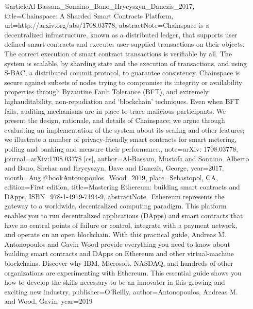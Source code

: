  @article{Al-Bassam_Sonnino_Bano_Hrycyszyn_Danezis_2017, title={Chainspace: A Sharded Smart Contracts Platform}, url={http://arxiv.org/abs/1708.03778}, abstractNote={Chainspace is a decentralized infrastructure, known as a distributed ledger, that supports user deﬁned smart contracts and executes user-supplied transactions on their objects. The correct execution of smart contract transactions is veriﬁable by all. The system is scalable, by sharding state and the execution of transactions, and using S-BAC, a distributed commit protocol, to guarantee consistency. Chainspace is secure against subsets of nodes trying to compromise its integrity or availability properties through Byzantine Fault Tolerance (BFT), and extremely highauditability, non-repudiation and ‘blockchain’ techniques. Even when BFT fails, auditing mechanisms are in place to trace malicious participants. We present the design, rationale, and details of Chainspace; we argue through evaluating an implementation of the system about its scaling and other features; we illustrate a number of privacy-friendly smart contracts for smart metering, polling and banking and measure their performance.}, note={arXiv: 1708.03778}, journal={arXiv:1708.03778 [cs]}, author={Al-Bassam, Mustafa and Sonnino, Alberto and Bano, Shehar and Hrycyszyn, Dave and Danezis, George}, year={2017}, month={Aug} }
 @book{Antonopoulos_Wood_2019, place={Sebastopol, CA}, edition={First edition}, title={Mastering Ethereum: building smart contracts and DApps}, ISBN={978-1-4919-7194-9}, abstractNote={Ethereum represents the gateway to a worldwide, decentralized computing paradigm. This platform enables you to run decentralized applications (DApps) and smart contracts that have no central points of failure or control, integrate with a payment network, and operate on an open blockchain. With this practical guide, Andreas M. Antonopoulos and Gavin Wood provide everything you need to know about building smart contracts and DApps on Ethereum and other virtual-machine blockchains. Discover why IBM, Microsoft, NASDAQ, and hundreds of other organizations are experimenting with Ethereum. This essential guide shows you how to develop the skills necessary to be an innovator in this growing and exciting new industry}, publisher={O’Reilly}, author={Antonopoulos, Andreas M. and Wood, Gavin}, year={2019} }
